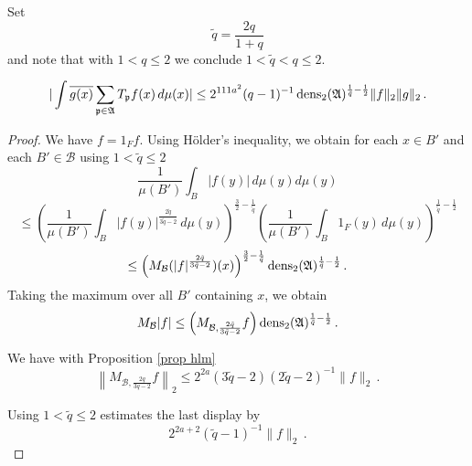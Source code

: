 Set
\begin{equation}
    \tilde{q}=\frac {2q}{1+q}
\end{equation}
and note that with $1< q\le 2$ we conclude $1<\tilde{q}<q\le 2$.
\begin{lemma}%
\label{lem decay t}

\begin{equation}\label{eqttt9}
  |\int \overline{g(x)} \sum_{\mathfrak p \in \mathfrak{A}} T_{\mathfrak p} f(x)\, d\mu(x)|\le
  2^{111a^2}({q}-1)^{-1} \operatorname{\operatorname{dens}}_2(\mathfrak{A})^{\frac 1{\tilde{q}}-\frac 12} \|f\|_2\|g\|_2\, .
\end{equation}
\end{lemma}
\begin{proof}
We have $f=1_Ff$. Using H\"older's inequality, we obtain for
each $x\in B'$ and each $B'\in \mathcal{B}$ using $1<\tilde{q}\le 2$
\begin{equation}
    \frac 1{\mu(B')}\int_B |f(y)|\, d\mu(y)d\mu(y)
\end{equation}
\begin{equation}
\le
\left(\frac 1{\mu(B')}\int_B |f(y)|^{\frac {2{\tilde{q}}}{3\tilde{q}-2}}\, d\mu(y)\right)^{\frac 32-\frac 1{\tilde{q}}}
\left(\frac 1{\mu(B')}\int_B 1_F(y)\, d\mu(y)\right)^{\frac 1{\tilde{q}}-\frac 12}
\end{equation}
\begin{equation}
\le \left(M_{\mathcal{B}} (|f|^{\frac {2{\tilde{q}}}{3{\tilde{q}}-2}})(x)\right)^{\frac 32-\frac 1{\tilde{q}}}
\operatorname{\operatorname{dens}}_2(\mathfrak{A})^{\frac 1{\tilde{q}}-\frac 12}\, .
\end{equation}
Taking the maximum over all $B'$ containing $x$, we obtain
\begin{equation} \label{eqttt1}
    M_{\mathcal{B}}|f|\le
     \left(M_{\mathcal{B},\frac {2{\tilde{q}}}{3{\tilde{q}}-2} } f\right)
\operatorname{\operatorname{dens}}_2(\mathfrak{A})^{\frac 1{\tilde{q}}-\frac 12}\, .
\end{equation}

We have with Proposition \ref{prop hlm}
\begin{equation}
\left\|M_{\mathcal{B}, \frac {2q}{3q-2}} f\right\|_2\le 2^{2a}(3\tilde{q}-2)(2\tilde{q}-2)^{-1}\|f\|_2\, .
\end{equation}

Using $1<\tilde{q}\le 2$ estimates the last display by
\begin{equation}\label{eqttt2}
 2^{2a+2} (\tilde{q}-1)^{-1}  \|f\|_2\, .
\end{equation}



\end{proof}
